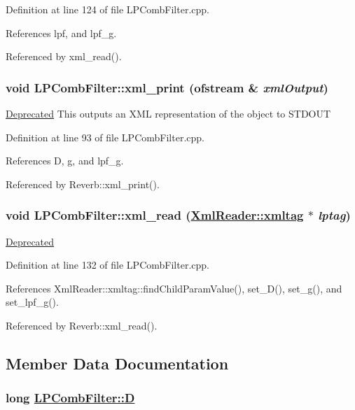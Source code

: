 Definition at line 124 of file LPComb\-Filter.cpp.

References lpf, and lpf\_\-g.

Referenced by xml\_\-read().\hypertarget{classLPCombFilter_a4}{
\subsubsection[xml\_\-print]{\setlength{\rightskip}{0pt plus 5cm}void LPComb\-Filter::xml\_\-print (ofstream \& {\em xml\-Output})}}
\label{classLPCombFilter_a4}


\begin{Desc}
\item[\hyperlink{deprecated__deprecated000020}{Deprecated}]This outputs an XML representation of the object to STDOUT \end{Desc}


Definition at line 93 of file LPComb\-Filter.cpp.

References D, g, and lpf\_\-g.

Referenced by Reverb::xml\_\-print().\hypertarget{classLPCombFilter_a9}{
\subsubsection[xml\_\-read]{\setlength{\rightskip}{0pt plus 5cm}void LPComb\-Filter::xml\_\-read (\hyperlink{classXmlReader_1_1xmltag}{Xml\-Reader::xmltag} $\ast$ {\em lptag})}}
\label{classLPCombFilter_a9}


\begin{Desc}
\item[\hyperlink{deprecated__deprecated000021}{Deprecated}]\end{Desc}


Definition at line 132 of file LPComb\-Filter.cpp.

References Xml\-Reader::xmltag::find\-Child\-Param\-Value(), set\_\-D(), set\_\-g(), and set\_\-lpf\_\-g().

Referenced by Reverb::xml\_\-read().

\subsection{Member Data Documentation}
\hypertarget{classLPCombFilter_r1}{
\subsubsection[D]{\setlength{\rightskip}{0pt plus 5cm}long \hyperlink{classLPCombFilter_r1}{LPComb\-Filter::D}}}
\label{classLPCombFilter_r1}



